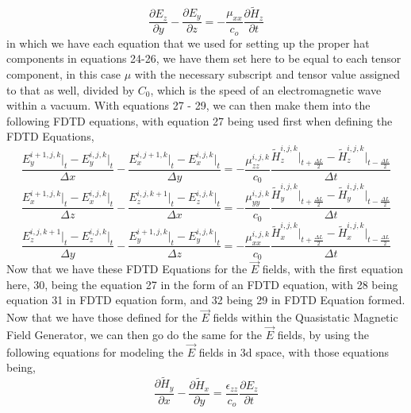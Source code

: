 \documentclass[]{article}
\begin{document}
\begin{equation}
\frac{\partial{E}_z}{\partial{y}} - \frac{\partial{E}_y}{\partial{z}} = -\frac{\mu_{xx}}{c_{o}} \frac{\partial{\tilde{H}_z}}{\partial{t}}
\end{equation}
in which we have each equation that we used for setting up the proper hat components in equations 24-26, we have them set here to be equal to each tensor component, in this case $\mu$ with the necessary subscript and tensor value assigned to that as well, divided by $C_0$, which is the speed of an electromagnetic wave within a vacuum. With equations 27 - 29, we can then make them into the following FDTD equations, with equation 27 being used first when defining the FDTD Equations,
\begin{equation}
\frac{E_{y}^{i+1, j, k} \Big|_t - E_{y}^{i,j,k}\Big|_t}{\Delta{x}} - \frac{E_{x}^{i, j+1, k} \Big|_t - E_{x}^{i,j,k}\Big|_t}{\Delta{y}} = -\frac{\mu_{zz}^{i,j,k}}{c_0} \frac{\tilde{H}_{z}^{i,j,k}\Big|_{t+\frac{\Delta{L}}{2}} - \tilde{H}_{z}^{i,j,k}\Big|_{t - \frac{\Delta{L}}{2}}}{\Delta{t}}
\end{equation} 
\begin{equation}
\frac{E_{x}^{i+1, j, k} \Big|_t - E_{x}^{i,j,k}\Big|_t}{\Delta{z}} - \frac{E_{z}^{i, j, k+1} \Big|_t - E_{z}^{i,j,k}\Big|_t}{\Delta{x}} = -\frac{\mu_{yy}^{i,j,k}}{c_0} \frac{\tilde{H}_{y}^{i,j,k}\Big|_{t+\frac{\Delta{L}}{2}} - \tilde{H}_{y}^{i,j,k}\Big|_{t - \frac{\Delta{L}}{2}}}{\Delta{t}}
\end{equation}
\begin{equation}
\frac{E_{z}^{i, j, k+1} \Big|_t - E_{z}^{i,j,k}\Big|_t}{\Delta{y}} - \frac{E_{y}^{i+1, j, k} \Big|_t - E_{y}^{i,j,k}\Big|_t}{\Delta{z}} = -\frac{\mu_{xx}^{i,j,k}}{c_0} \frac{\tilde{H}_{x}^{i,j,k}\Big|_{t+\frac{\Delta{L}}{2}} - \tilde{H}_{x}^{i,j,k}\Big|_{t - \frac{\Delta{L}}{2}}}{\Delta{t}}
\end{equation}
Now that we have these FDTD Equations for the $\vec{E}$ fields, with the first equation here, 30, being the equation 27 in the form of an FDTD equation, with 28 being equation 31 in FDTD equation form, and 32 being 29 in FDTD Equation formed. Now that we have those defined for the $\vec{E}$ fields within the Quasistatic Magnetic Field Generator, we can then go do the same for the $\vec{E}$ fields, by using the following equations for modeling the $\vec{E}$ fields in 3d space, with those equations being,
\begin{equation}
\frac{\partial{\tilde{H}}_y}{\partial{x}} - \frac{\partial{\tilde{{H}}}_x}{\partial{y}} = \frac{\epsilon_{zz}}{c_{o}} \frac{\partial{E}_z}{\partial{t}}
\end{equation}
\end{document}
